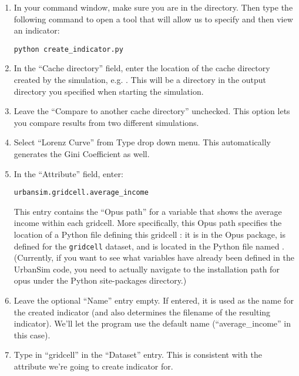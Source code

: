 \documentclass{howto}
\begin{document}
\begin{enumerate}

\item In your command window, make sure you are in the
 directory.  Then type the following command to
open a tool that will allow us to specify and then view an
indicator:

\begin{verbatim}
python create_indicator.py
\end{verbatim}

\item In the ``Cache directory'' field, enter the location of the cache directory
created by the
simulation, e.g. .
This will be a directory in the output directory you specified when
starting the simulation.

\item Leave the ``Compare to another cache directory'' unchecked.  This option lets you 
compare results from two different simulations.

\item Select ``Lorenz Curve'' from Type drop down menu. This automatically generates the
Gini Coefficient as well.

\item In the ``Attribute'' field, enter:

\begin{verbatim}
urbansim.gridcell.average_income
\end{verbatim}

This entry contains the ``Opus path'' for a variable that shows the
average income within each gridcell.  More specifically, this Opus path specifies
the location of a Python file defining this gridcell : it is
in the  Opus package, is defined for the
\verb|gridcell| dataset, and is located in the Python file named
. (Currently,
if you want to see what variables have already been defined in the UrbanSim code,
you need to actually navigate to the installation path for opus
under the Python site-packages directory.)

\item Leave the optional ``Name'' entry empty. If entered, it is used
as the name for the created indicator (and also determines the filename of the
resulting indicator). We'll let the program use the default name
(``average_income'' in this case).

\item Type in ``gridcell'' in the ``Dataset'' entry.  This is consistent with the attribute 
we're going to create indicator for. 


\end{enumerate}
\end{document}
